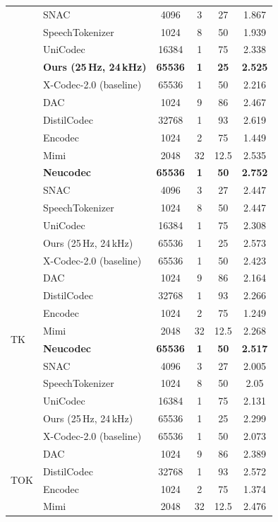 \documentclass[preprint]{article}
\begin{document}
\begin{longtable}{llcccc}
  & SNAC & 4096 & 3 & 27 & 1.867 \\
  & SpeechTokenizer & 1024 & 8 & 50 & 1.939 \\
  & UniCodec & 16384 & 1 & 75 & 2.338 \\
  & \textbf{Ours (25\,Hz, 24\,kHz)} & \textbf{65536} & \textbf{1} & \textbf{25} & \textbf{2.525} \\
  & X-Codec-2.0 (baseline) & 65536 & 1 & 50 & 2.216 \\
\newpage
\multirow{8}{*}{TIG}
  & DAC & 1024 & 9 & 86 & 2.467 \\
  & DistilCodec & 32768 & 1 & 93 & 2.619 \\
  & Encodec & 1024 & 2 & 75 & 1.449 \\
  & Mimi & 2048 & 32 & 12.5 & 2.535 \\
  & \textbf{Neucodec} & \textbf{65536} & \textbf{1} & \textbf{50} & \textbf{2.752} \\
  & SNAC & 4096 & 3 & 27 & 2.447 \\
  & SpeechTokenizer & 1024 & 8 & 50 & 2.447 \\
  & UniCodec & 16384 & 1 & 75 & 2.308 \\
  & Ours (25\,Hz, 24\,kHz) & 65536 & 1 & 25 & 2.573 \\
  & X-Codec-2.0 (baseline) & 65536 & 1 & 50 & 2.423 \\
\midrule
\multirow{8}{*}{TK}
  & DAC & 1024 & 9 & 86 & 2.164 \\
  & DistilCodec & 32768 & 1 & 93 & 2.266 \\
  & Encodec & 1024 & 2 & 75 & 1.249 \\
  & Mimi & 2048 & 32 & 12.5 & 2.268 \\
  & \textbf{Neucodec} & \textbf{65536} & \textbf{1} & \textbf{50} & \textbf{2.517} \\
  & SNAC & 4096 & 3 & 27 & 2.005 \\
  & SpeechTokenizer & 1024 & 8 & 50 & 2.05 \\
  & UniCodec & 16384 & 1 & 75 & 2.131 \\
  & Ours (25\,Hz, 24\,kHz) & 65536 & 1 & 25 & 2.299 \\
  & X-Codec-2.0 (baseline) & 65536 & 1 & 50 & 2.073 \\
\midrule
\multirow{8}{*}{TOK}
  & DAC & 1024 & 9 & 86 & 2.389 \\
  & DistilCodec & 32768 & 1 & 93 & 2.572 \\
  & Encodec & 1024 & 2 & 75 & 1.374 \\
  & Mimi & 2048 & 32 & 12.5 & 2.476 \\

\end{longtable}
\end{document}
